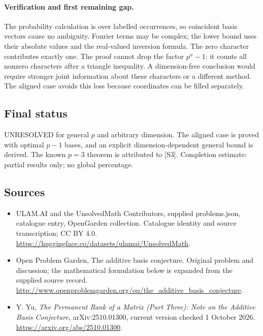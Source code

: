 \documentclass[11pt,a4paper]{article}
\begin{document}
\paragraph{Verification and first remaining gap.}
The probability calculation is over labelled occurrences, so coincident
basis vectors cause no ambiguity. Fourier terms may be complex; the
lower bound uses their absolute values and the real-valued inversion
formula. The zero character contributes exactly one. The proof cannot
drop the factor $p^n-1$: it counts all nonzero characters after a
triangle inequality. A dimension-free conclusion would require stronger
joint information about these characters or a different method. The
aligned case avoids this loss because coordinates can be filled separately.

\subsection{Final status}
UNRESOLVED for general $p$ and arbitrary dimension. The aligned case
is proved with optimal $p-1$ bases, and an explicit dimension-dependent
general bound is derived. The known $p=3$ theorem is attributed to [S3].
Completion estimate: partial results only; no global percentage.

\subsection{Sources}
\begin{itemize}
\item[S1] ULAM.AI and the UnsolvedMath Contributors, supplied problems.json, catalogue entry, OpenGarden collection. Catalogue identity and source transcription; CC BY 4.0.
\url{https://huggingface.co/datasets/ulamai/UnsolvedMath}.
\item[S2] Open Problem Garden, The additive basis conjecture. Original problem and discussion; the mathematical formulation below is expanded from the supplied source record.
\url{http://www.openproblemgarden.org/op/the_additive_basis_conjecture}.
\item[S3] Y. Yu, \emph{The Permanent Rank of a Matrix (Part Three): Note on the Additive Basis Conjecture}, arXiv:2510.01300, current version checked 1 October 2026.
\url{https://arxiv.org/abs/2510.01300}.
\end{itemize}
\end{document}
